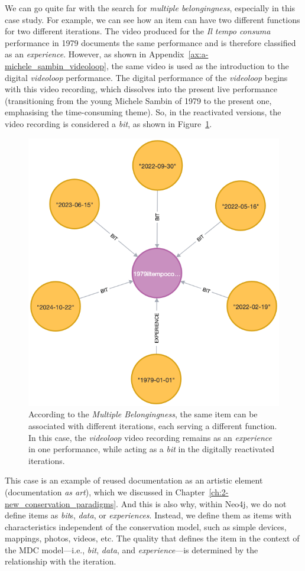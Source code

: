 We can go quite far with the search for \textit{multiple belongingness}, especially in this case study. For example, we can see how an item can have two different functions for two different iterations. The video produced for the \textit{Il tempo consuma} performance in 1979 documents the same performance and is therefore classified as an \textit{experience}. However, as shown in Appendix~\ref{ax:a-michele_sambin_videoloop}, the same video is used as the introduction to the digital \textit{videoloop} performance. The digital performance of the \textit{videoloop} begins with this video recording, which dissolves into the present live performance (transitioning from the young Michele Sambin of 1979 to the present one, emphasising the time-consuming theme). So, in the reactivated versions, the video recording is considered a \textit{bit}, as shown in Figure~\ref{fig:c4-neo4j-expbit}.
\begin{figure}[!h]
    \centering
    \includegraphics[width=0.75\linewidth]{chapters/4-MDC_model_application/image/neo4j-expbit.png}
    \caption{According to the \textit{Multiple Belongingness}, the same item can be associated with different iterations, each serving a different function. In this case, the \textit{videoloop} video recording remains as an \textit{experience} in one performance, while acting as a \textit{bit} in the digitally reactivated iterations.}
    \label{fig:c4-neo4j-expbit}
\end{figure}
This case is an example of reused documentation as an artistic element (documentation \textit{as art}), which we discussed in Chapter~\ref{ch:2-new_conservation_paradigms}. And this is also why, within Neo4j, we do not define items as \textit{bit}s, \textit{data}, or \textit{experiences}. Instead, we define them as items with characteristics independent of the conservation model, such as simple devices, mappings, photos, videos, etc. The quality that defines the item in the context of the MDC model—i.e., \textit{bit}, \textit{data}, and \textit{experience}—is determined by the relationship with the iteration.\\
